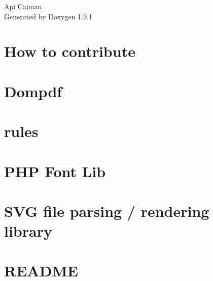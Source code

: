 \let\mypdfximage\pdfximage\def\pdfximage{\immediate\mypdfximage}\documentclass[twoside]{book}
\newcommand{\+}{\discretionary{\mbox{\scriptsize$\hookleftarrow$}}{}{}}
\newcommand{\clearemptydoublepage}{%
  \newpage{\pagestyle{empty}\cleardoublepage}%
}
\begin{document}
\raggedbottom

\hypersetup{pageanchor=false,
             bookmarksnumbered=true,
             pdfencoding=unicode
            }
\begin{titlepage}
\vspace*{7cm}
\begin{center}%
{\Large Api Caiman }\\
\vspace*{1cm}
{\large Generated by Doxygen 1.9.1}\\
\end{center}
\end{titlepage}
\clearemptydoublepage
{}
\tableofcontents
\clearemptydoublepage
{}
\hypersetup{pageanchor=true}

\chapter{How to contribute}
\label{md_vendor_dompdf_dompdf__c_o_n_t_r_i_b_u_t_i_n_g}

\chapter{Dompdf}
\label{md_vendor_dompdf_dompdf__r_e_a_d_m_e}

\chapter{rules}
\label{rules}

\chapter{PHP Font Lib}
\label{md_vendor_phenx_php_font_lib__r_e_a_d_m_e}

\chapter{SVG file parsing / rendering library}
\label{md_vendor_phenx_php_svg_lib__r_e_a_d_m_e}

\chapter{README}
\label{md_vendor_phpmailer_phpmailer__r_e_a_d_m_e}

\end{document}
